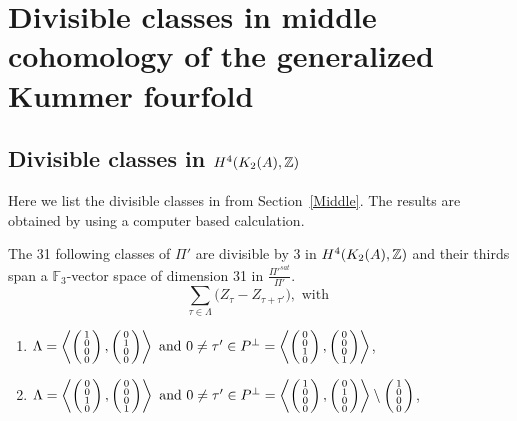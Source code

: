 \chapter{Divisible classes in middle cohomology of the generalized Kummer fourfold}
\section{Divisible classes in \texorpdfstring{$H^4(\X,\Z)$}{middle cohomology of the generalized Kummer fourfold}}\label{SpecialClasses}
Here we list the divisible classes in from Section~\ref{Middle}. The results are obtained by using a computer based calculation.
\begin{prop}\label{XXXI}
The 31 following classes of $\Pi'$ are divisible by 3 in $H^{4}(K_2(A),\Z)$ and their thirds span a $\mathbb F_3$-vector space of dimension 31 in $\frac{\Pi'^{sat}}{\Pi'}$.
$$\sum_{\tau\in\Lambda} \Big(Z_{\tau} - Z_{\tau+\tau'}\Big), \text{ with }$$
\begin{enumerate}
\item
$\Lambda=\plan{1\\0\\0\\0}{0\\1\\0\\0} \text{ and } 0\neq \tau'\in P^\perp = \plan{0\\0\\1\\0}{0\\0\\0\\1} $,

\item
$\Lambda=\plan{0\\0\\1\\0}{0\\0\\0\\1}  \text{ and } 0\neq \tau' \in P^\perp = \plan{1\\0\\0\\0}{0\\1\\0\\0} \setminus \vect{1\\0\\0\\0}$,


\end{enumerate}
\end{prop}
